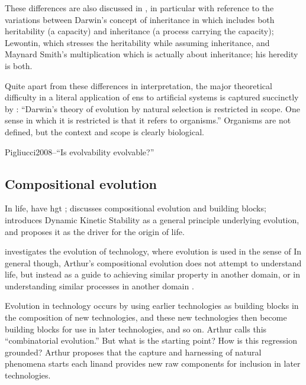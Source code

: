 These differences are also discussed in \parencite{Griesemer2001}, in particular with reference to the variations between Darwin's concept of inheritance in \cite{Darwin1859} which includes both heritability (a capacity) and inheritance (a process carrying the capacity); Lewontin, which stresses the heritability while assuming inheritance, and Maynard Smith's multiplication which is actually about inheritance; his heredity is both. \parencite{Griesemer2001}

Quite apart from these differences in interpretation, the major theoretical difficulty in a literal application of \gls{ens} to artificial systems is captured succinctly by \parencite{Griesemer2005}: ``Darwin's theory of evolution by natural selection is restricted in scope. One sense in which it is restricted is that it refers to organisms.'' Organisms are not defined, but the context and scope is clearly biological.

Pigliucci2008--``Is evolvability evolvable?''

\subsection{Compositional evolution}

In life, have \gls{hgt} \eg \parencite{Ochman2000}; \parencite{Watson2002} discusses compositional evolution and building blocks; \parencite{Pross2011} introduces Dynamic Kinetic Stability as a general principle underlying evolution, and proposes it as the driver for the origin of life.

\parencite{Arthur2009} investigates the evolution of technology, where evolution is used in the sense of  In general though, Arthur's compositional evolution does not attempt to understand life, but instead as a guide to achieving similar property in another domain, or in understanding similar processes in another domain \parencite{Arthur2009}.

Evolution in technology occurs by using earlier technologies as building blocks in the composition of new technologies, and these new technologies then become building blocks for use in later technologies, and so on. Arthur calls this ``combinatorial evolution.'' But what is the starting point? How is this regression grounded? Arthur proposes that the capture and harnessing of natural phenomena starts each lin\eg and provides new raw components for inclusion in later technologies.

